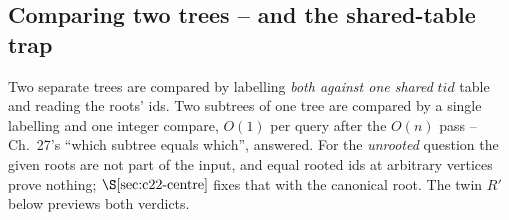 \subsection{Comparing two trees -- and the shared-table trap}

Two separate trees are compared by labelling \emph{both against one shared}
\(\mathit{tid}\) table and reading the roots' ids.  Two subtrees of one tree are
compared by a single labelling and one integer compare, \(O(1)\) per query after
the \(O(n)\) pass -- Ch.~27's ``which subtree equals which'', answered.  For the
\emph{unrooted} question the given roots are not part of the input, and equal
rooted ids at arbitrary vertices prove nothing; \(\secref{c22-centre}\) fixes
that with the canonical root.  The twin \(R'\) below previews both verdicts.


